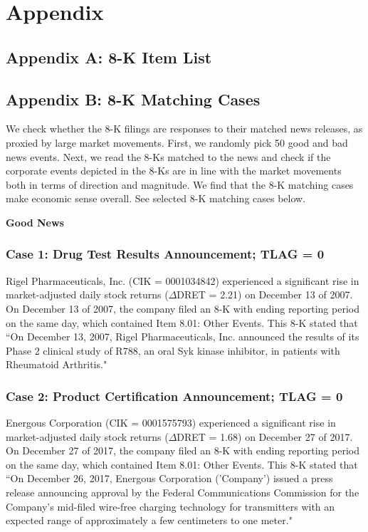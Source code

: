\section*{Appendix}
\subsection*{Appendix A: 8-K Item List}
\label{appa}


\newpage

\subsection*{Appendix B: 8-K Matching Cases}
\label{appb}
We check whether the 8-K filings are responses to their matched news releases, as proxied by large market movements. First, we randomly pick 50 good and bad news events. Next, we read the 8-Ks matched to the news and check if the corporate events depicted in the 8-Ks are in line with the market movements both in terms of direction and magnitude. We find that the 8-K matching cases make economic sense overall. See selected 8-K matching cases below.
\begin{center}
	\textbf{Good News}
\end{center}
\subsubsection*{Case 1: Drug Test Results Announcement; TLAG = 0}
Rigel Pharmaceuticals, Inc. (CIK = 0001034842) experienced a significant rise in market-adjusted daily stock returns ($\Delta$DRET = 2.21) on December 13 of 2007. On December 13 of 2007, the company filed an 8-K with ending reporting period on the same day, which contained Item 8.01: Other Events. This 8-K stated that ``On December 13, 2007, Rigel Pharmaceuticals, Inc. announced the results of its Phase 2 clinical study of R788, an oral Syk kinase inhibitor, in patients with Rheumatoid Arthritis." 
\subsubsection*{Case 2: Product Certification Announcement; TLAG = 0}
Energous Corporation (CIK = 0001575793) experienced a significant rise in market-adjusted daily stock returns ($\Delta$DRET = 1.68) on December 27 of 2017. On December 27 of 2017, the company filed an 8-K with ending reporting period on the same day, which contained Item 8.01: Other Events. This 8-K stated that ``On December 26, 2017, Energous Corporation ('Company') issued a press release announcing approval by the Federal Communications Commission for the Company’s mid-filed wire-free charging technology for transmitters with an expected range of approximately a few centimeters to one meter."
